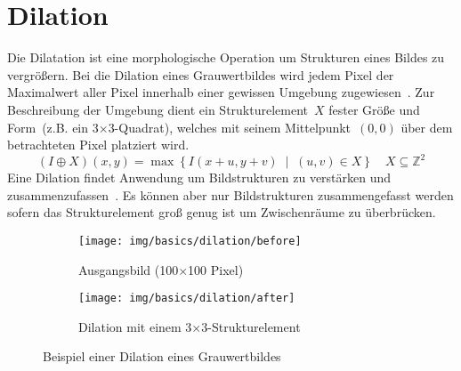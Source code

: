 \section{Dilation}
\writtenby{\dcauthornameewie}%
Die Dilatation ist eine morphologische Operation um Strukturen eines Bildes zu vergrößern.
Bei die Dilation eines Grauwertbildes wird jedem Pixel der Maximalwert aller Pixel innerhalb einer gewissen Umgebung zugewiesen~\cite[Kapitel~3.5]{steinmueller2008}.
Zur Beschreibung der Umgebung dient ein Strukturelement~$X$ fester Größe und Form~(z.B. ein 3$\times$3-Quadrat), welches mit seinem Mittelpunkt~$(0,0)$ über dem betrachteten Pixel platziert wird.
\begin{equation}
  (I\oplus X)(x,y)= \max \left\{ I(x+u,y+v) \;\middle|\; (u,v) \in X \right\} \quad X \subseteq \mathbb{Z}^2
\end{equation}
Eine Dilation findet Anwendung um Bildstrukturen zu verstärken und zusammenzufassen~\cite[Kapitel~3.1]{steinmueller2008}.
Es können aber nur Bildstrukturen zusammengefasst werden sofern das Strukturelement groß genug ist um Zwischenräume zu überbrücken.

\begin{figure}[H]
  \label{fig:dilation}
  \centering
  \begin{subfigure}[t]{.49\linewidth}
    \centering
    \texttt{[image: img/basics/dilation/before]}
    \caption{Ausgangsbild (100$\times$100 Pixel)}
  \end{subfigure}
  \begin{subfigure}[t]{.49\linewidth}
    \centering
    \texttt{[image: img/basics/dilation/after]}
    \caption{Dilation mit einem 3$\times$3-Strukturelement}
  \end{subfigure}
  \caption{Beispiel einer Dilation eines Grauwertbildes}
\end{figure}

